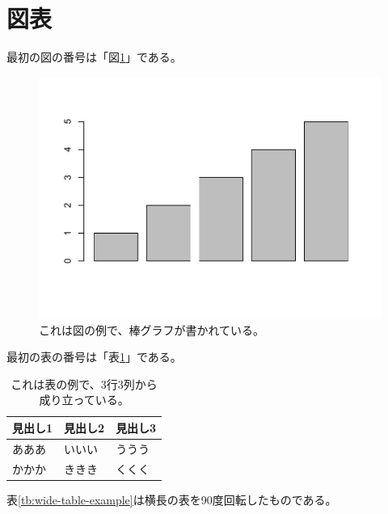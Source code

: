 \documentclass[ %
	uplatex,%
	a5paper,%
	papersize%
	]{jsbook}
\begin{document}
						\section{図表}
						最初の図の番号は「図\ref{fg:figure-example}」である。

						\begin{figure}[h]
							\centering
							\includegraphics[width=0.8\hsize]{barplot01.pdf}
							\caption{これは図の例で、棒グラフが書かれている。}
							\label{fg:figure-example}
						\end{figure}


						最初の表の番号は「表\ref{tb:table-example}」である。

						\begin{table}[h]
							\caption{これは表の例で、3行3列から成り立っている。}
							\label{tb:table-example}
							\begin{center}
								\begin{tabular}{lll} \toprule
									見出し1 & 見出し2 & 見出し3 \\ \midrule
									あああ & いいい & ううう \\
									かかか & ききき & くくく \\ \bottomrule
								\end{tabular}
							\end{center}
						\end{table}

						表\ref{tb:wide-table-example}は横長の表を90度回転したものである。
\end{document}
